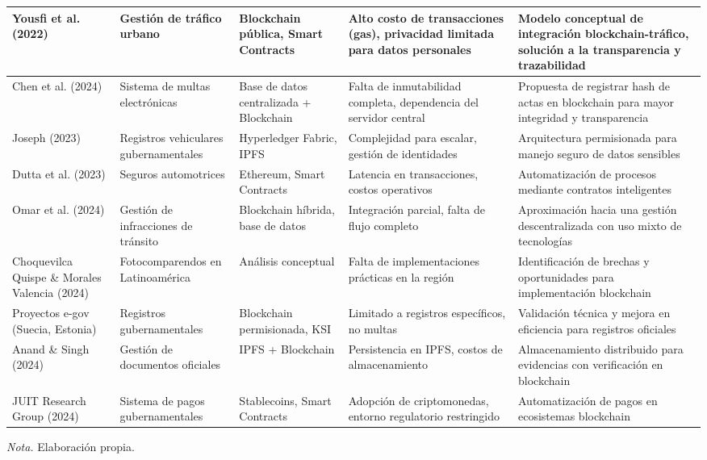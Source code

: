 \begin{longtable}{p{2.8cm} p{2.5cm} p{2.5cm} p{2.8cm} p{3.5cm}}
        \bottomrule
        \endlastfoot
        Yousfi et al. (2022) & Gestión de tráfico urbano & Blockchain pública, Smart Contracts & Alto costo de transacciones (gas), privacidad limitada para datos personales & Modelo conceptual de integración blockchain-tráfico, solución a la transparencia y trazabilidad \\
        \midrule
        Chen et al. (2024) & Sistema de multas electrónicas & Base de datos centralizada + Blockchain & Falta de inmutabilidad completa, dependencia del servidor central & Propuesta de registrar hash de actas en blockchain para mayor integridad y transparencia \\
        \midrule
        Joseph (2023) & Registros vehiculares gubernamentales & Hyperledger Fabric, IPFS & Complejidad para escalar, gestión de identidades & Arquitectura permisionada para manejo seguro de datos sensibles \\
        \midrule
        Dutta et al. (2023) & Seguros automotrices & Ethereum, Smart Contracts & Latencia en transacciones, costos operativos & Automatización de procesos mediante contratos inteligentes \\
        \midrule
        Omar et al. (2024) & Gestión de infracciones de tránsito & Blockchain híbrida, base de datos & Integración parcial, falta de flujo completo & Aproximación hacia una gestión descentralizada con uso mixto de tecnologías \\
        \midrule
        Choquevilca Quispe \& Morales Valencia (2024) & Fotocomparendos en Latinoamérica & Análisis conceptual & Falta de implementaciones prácticas en la región & Identificación de brechas y oportunidades para implementación blockchain \\
        \midrule
        Proyectos e-gov (Suecia, Estonia) & Registros gubernamentales & Blockchain permisionada, KSI & Limitado a registros específicos, no multas & Validación técnica y mejora en eficiencia para registros oficiales \\
        \midrule
        Anand \& Singh (2024) & Gestión de documentos oficiales & IPFS + Blockchain & Persistencia en IPFS, costos de almacenamiento & Almacenamiento distribuido para evidencias con verificación en blockchain \\
        \midrule
        JUIT Research Group (2024) & Sistema de pagos gubernamentales & Stablecoins, Smart Contracts & Adopción de criptomonedas, entorno regulatorio restringido & Automatización de pagos en ecosistemas blockchain \\
    \end{longtable}
    \vspace{1em}
    \begin{flushleft}
        \textit{Nota.} Elaboración propia.
    \end{flushleft}
    \label{tab:estado_arte_comparativo}

